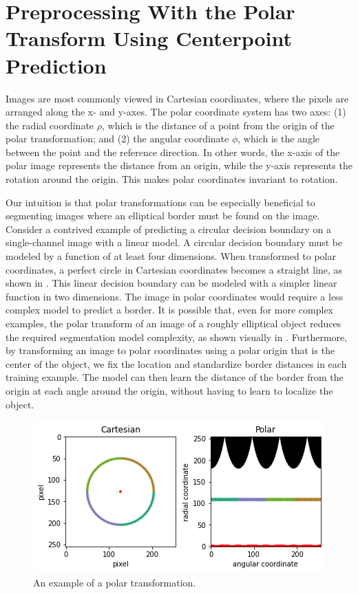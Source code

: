 \section{Preprocessing With the Polar Transform Using Centerpoint Prediction}

Images are most commonly viewed in Cartesian coordinates, where the pixels are arranged along the x- and y-axes. The polar coordinate system has two axes: (1) the radial coordinate $
\rho$, which is the distance 
of a point from the origin of the polar transformation; and (2) the angular coordinate $\phi$, which is the angle 
between the point and the reference direction. In other words, the x-axis of the polar image represents the 
distance from an origin, while the y-axis represents the rotation around the origin. This makes polar coordinates 
invariant to rotation.

Our intuition is that polar transformations can be especially beneficial to segmenting images where an 
elliptical border must be found on the image. Consider a contrived example of predicting a 
circular decision boundary on a single-channel image with a linear model. A circular decision boundary 
must be modeled by a function of at least four dimensions. When transformed to 
polar coordinates, a perfect circle in Cartesian coordinates becomes a straight line, as shown in 
. This linear decision boundary can be modeled with a simpler linear function 
in two dimensions. The image in polar coordinates would require a less complex model to predict a 
border. It is possible that, even for more complex examples, the polar transform of an image of a roughly 
elliptical object reduces the required segmentation model complexity, as shown visually in 
. Furthermore, by transforming an image to polar coordinates using a polar origin 
that is the center of the object, we fix the location and standardize border distances in each training 
example. The model can then learn the distance of the border from the origin at each angle around the 
origin, without having to learn to localize the object.

	\begin{figure}[h]
		\centering
		\includegraphics[width=0.6\linewidth]{images/4/polar-transform}
		\caption{An example of a polar transformation.}
		\label{fig:polar-coords}
	\end{figure}


